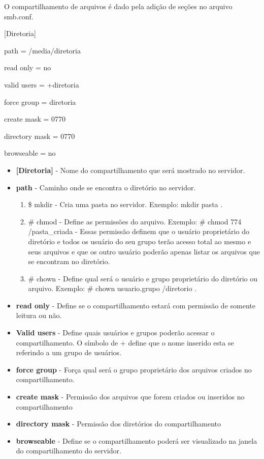 O compartilhamento de arquivos é dado pela adição de seções no arquivo smb.conf.

[Diretoria]

path = /media/diretoria

read only = no

valid users = +diretoria

force group = diretoria

create mask = 0770

directory mask = 0770

browseable = no

\begin{itemize}
	\item \textbf{[Diretoria]} - Nome do compartilhamento que será mostrado no servidor.
	\item \textbf{path} - Caminho onde se encontra o diretório no servidor.
		\begin{enumerate}
			\item {\$ mkdir} - Cria uma pasta no servidor. Exemplo: mkdir pasta .
			\item {\# chmod} - Define as permissões do arquivo. Exemplo: \# chmod 774 /pasta\_criada - Essas permissão definem que o usuário proprietário do diretório e todos os usuário do seu grupo terão acesso total ao mesmo e seus arquivos e que os outro usuário poderão apenas listar os arquivos que se encontram no diretório.
			\item {\# chown} - Define qual será o usuário e grupo proprietário do diretório ou arquivo. Exemplo: \# chown usuario.grupo /diretorio .
		\end{enumerate} 
	\item \textbf{read only} - Define se o compartilhamento estará com permissão de somente leitura ou não.
	\item \textbf{Valid users} - Define quais usuários e grupos poderão acessar o compartilhamento. O símbolo de + define que o nome inserido esta se referindo a um grupo de usuários.
	\item \textbf{force group} - Força qual será o grupo proprietário dos arquivos criados no compartilhamento.
	\item \textbf{create mask} - Permissão dos arquivos que forem criados ou inseridos no compartilhamento
	\item \textbf{directory mask} - Permissão dos diretórios do compartilhamento
	\item \textbf{browseable} - Define se o compartilhamento poderá ser visualizado na janela do compartilhamento do servidor.
\end{itemize}

